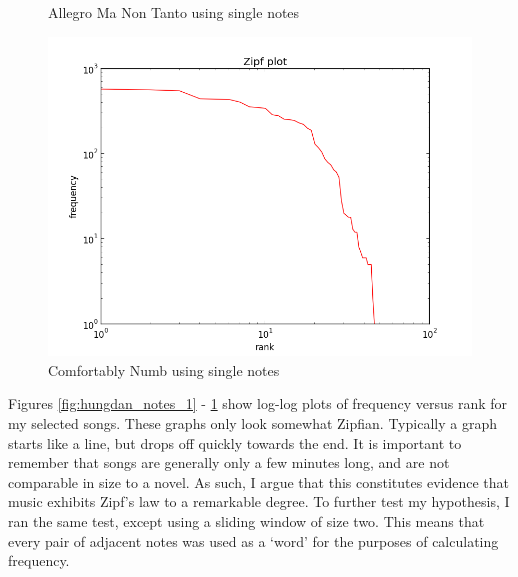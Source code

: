 \documentclass[10pt]{book}
\begin{document}
\begin{figure}[!htb]
  \caption{Allegro Ma Non Tanto using single notes}\label{fig:rach_notes_1}
\endminipage\hfill
{}%
  \includegraphics[width=\linewidth]{comf_notes_1}
  \caption{Comfortably Numb using single notes}\label{fig:comf_notes_1}
\endminipage
\end{figure}

Figures \ref{fig:hungdan_notes_1} - \ref{fig:comf_notes_1} show log-log plots of frequency versus rank for my selected songs. These graphs only look somewhat Zipfian. Typically a graph starts like a line, but drops off quickly towards the end. It is important to remember that songs are generally only a few minutes long, and are not comparable in size to a novel. As such, I argue that this constitutes evidence that music exhibits Zipf's law to a remarkable degree. To further test my hypothesis, I ran the  same test, except using a sliding window of size two. This means that every pair of adjacent notes was used as a `word' for the purposes of calculating frequency.
\end{document}
